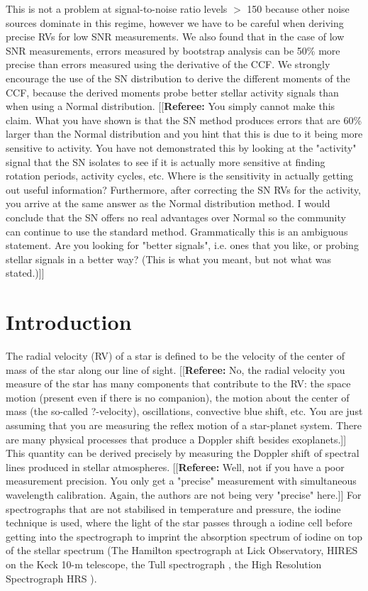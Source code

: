 \documentclass[11pt, oneside]{article}
\newcommand{\comment}[1]{{\color{red}[[\textbf{Referee: }#1]]}}
\begin{document}
This is not a problem at signal-to-noise ratio levels $>$ 150 because other noise sources dominate in this regime, however we have to be careful when deriving precise RVs for low SNR measurements. We also found that in the case of low SNR measurements, errors measured by bootstrap analysis can be 50\% more precise than errors measured using the derivative of the CCF.
We strongly encourage the use of the SN distribution to derive the different moments of the CCF, because the derived moments probe better stellar activity signals than when using a Normal distribution.
\comment{You simply cannot make this claim. What you have shown is that the SN method produces errors that are 60\% larger than the Normal distribution and you hint that this is due to it being more sensitive to activity. You have not demonstrated this by looking at the "activity" signal that the SN isolates to see if it is actually more sensitive at finding rotation periods, activity cycles, etc. Where is the sensitivity in actually getting out useful information? Furthermore, after correcting the SN RVs for the activity, you arrive at the same answer as the Normal distribution method. I would conclude that the SN offers no real advantages over Normal so the community can continue to use the standard method.
Grammatically this is an ambiguous statement. Are you looking for "better signals", i.e. ones that you like, or probing stellar signals in a better way? (This is what you meant, but not what was stated.)}


\section{Introduction}
\label{intro}

The radial velocity (RV) of a star is defined to be the velocity of the center of mass of the star along our line of sight. 
\comment{No, the radial velocity you measure of the star has many components that contribute to the RV: the space motion (present even if there is no companion), the motion about the center of mass (the so-called ?-velocity), oscillations, convective blue shift, etc.
You are just assuming that you are measuring the reflex motion of a star-planet system. There are many physical processes that produce a Doppler shift besides exoplanets.}
This quantity can be derived precisely by measuring the Doppler shift of spectral lines produced in stellar atmospheres. 
\comment{Well, not if you have a poor measurement precision. You only get a "precise" measurement with simultaneous wavelength calibration. Again, the authors are not being very "precise" here.}
For spectrographs that are not stabilised in temperature and pressure, the iodine technique is used, where the light of the star passes through a iodine cell before getting into the spectrograph to imprint the absorption spectrum of iodine on top of the stellar spectrum (The Hamilton spectrograph \citep{Vogt1987} at Lick Observatory, HIRES \citep{Vogt1994} on the Keck 10-m telescope, the Tull spectrograph  \citep{Tull1995}, the High Resolution Spectrograph HRS  \citep{Tull1998}). 
\end{document}
